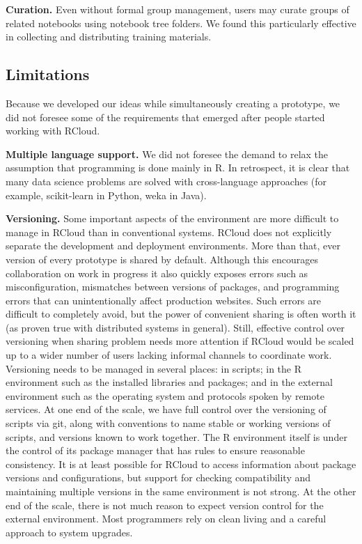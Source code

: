 {\bf Curation.} Even without formal group management, users may
curate groups of related notebooks using notebook tree folders.
We found this particularly effective in collecting and distributing
training materials.

\subsection{Limitations}
Because we developed our ideas while simultaneously creating a prototype,
we did not foresee some of the requirements that emerged after
people started working with RCloud.

{\bf Multiple language support.}
We did not foresee the demand to relax the assumption that programming
is done mainly in R. In retrospect, it is clear that many data science
problems are solved with cross-language approaches (for example, scikit-learn
in Python, weka in Java).

{\bf Versioning.}
Some important aspects of the environment are more difficult to manage
in RCloud than in conventional systems. RCloud does not explicitly
separate the development and deployment environments. More than that,
ever version of every prototype is shared by default. Although this encourages
collaboration on work in progress it also quickly exposes errors such as
misconfiguration, mismatches between versions of packages, and programming
errors that can unintentionally affect production websites. Such errors
are difficult to completely avoid, but the power of convenient sharing is often
worth it (as proven true with distributed systems in general).
Still, effective control over versioning when sharing problem needs more
attention if RCloud would be scaled up to a wider number of users lacking
informal channels to coordinate work.
Versioning needs to be managed in several places: in scripts;
in the R environment such as the installed libraries and packages;
and in the external environment such as the operating system and
protocols spoken by remote services. At one end of the scale, we have
full control over the versioning of scripts via git, along with conventions
to name stable or working versions of scripts, and versions known to work together.
The R environment itself is under the control of its package manager
that has rules to ensure reasonable consistency.
It is at least possible for RCloud to access information about
package versions and configurations, but support for checking compatibility
and maintaining multiple versions in the same environment is not strong.
At the other end of the scale, there is not much reason to expect version
control for the external environment. Most programmers rely on clean living
and a careful approach to system upgrades.

